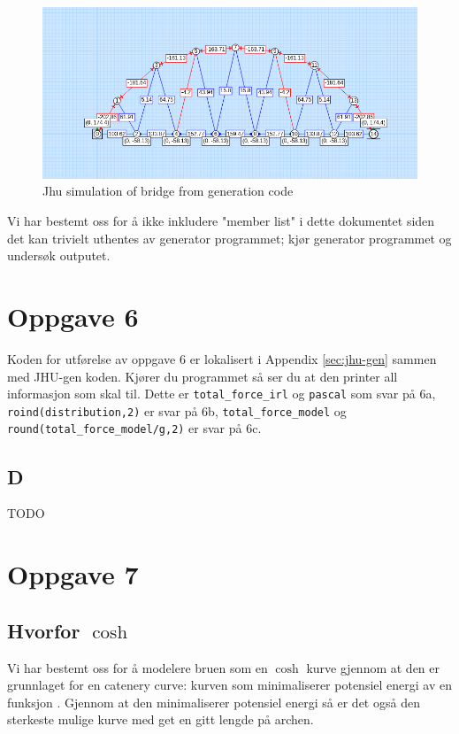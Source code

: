 \documentclass{report}
\begin{document}
\begin{figure}[H]
	\centering
	\includegraphics [width=.8\linewidth]{jhu}
	\caption{Jhu simulation of bridge from generation code}
	\label{fig:jhu}
\end{figure}

Vi har bestemt oss for å ikke inkludere "member list" i dette dokumentet siden det kan trivielt uthentes av generator programmet; kjør generator programmet og undersøk outputet.

\section{Oppgave 6}

Koden for utførelse av oppgave 6 er lokalisert i Appendix \ref{sec:jhu-gen} sammen med JHU-gen koden. Kjører du programmet så ser du at den printer all informasjon som skal til. Dette er \lstinline{total_force_irl} og \lstinline{pascal} som svar på 6a, \lstinline{roind(distribution,2)} er svar på 6b, \lstinline{total_force_model} og \lstinline{round(total_force_model/g,2)} er svar på 6c.

\subsection*{D}

TODO

\section{Oppgave 7}

\subsection {Hvorfor $\cosh$}

Vi har bestemt oss for å modelere bruen som en $\cosh$ kurve gjennom at den er grunnlaget for en catenery curve: kurven som minimaliserer potensiel energi av en funksjon \cite{wiki:catenery}. Gjennom at den minimaliserer potensiel energi så er det også den sterkeste mulige kurve med get en gitt lengde på archen.
\end{document}
